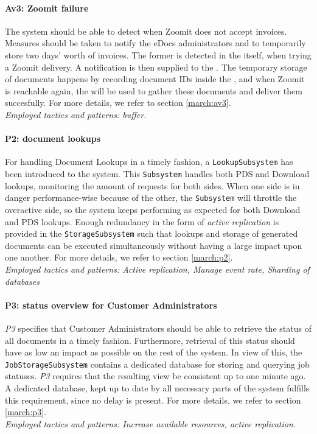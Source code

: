 \paragraph{Av3: Zoomit failure} The system should be able to detect when Zoomit does not accept invoices. Measures should be taken to notify the eDocs administrators and to temporarily store two days' worth of invoices. The former is detected in the  itself, when trying a Zoomit delivery. A notification is then supplied to the . The temporary storage of documents happens by recording document IDs inside the , and when Zoomit is reachable again, the  will be used to gather these documents and deliver them succesfully. For more details, we refer to section \ref{march:av3}.\\
\emph{Employed tactics and patterns: buffer.}
    
\paragraph{P2: document lookups}
For handling Document Lookups in a timely fashion, a \texttt{LookupSubsystem} has been introduced to the system. This \texttt{Subsystem} handles both PDS and Download lookups, monitoring the amount of requests for both sides. When one side is in danger performance-wise because of the other, the \texttt{Subsystem} will throttle the overactive side, so the system keeps performing as expected for both Download and PDS lookups. Enough redundancy in the form of \emph{active replication} is provided in the \texttt{StorageSubsystem} such that lookups and storage of generated documents can be executed simultaneously without having a large impact upon one another. For more details, we refer to section \ref{march:p2}.\\
\emph{Employed tactics and patterns: Active replication, Manage event rate, Sharding of databases}
    
\paragraph{P3: status overview for Customer Administrators} \emph{P3} specifies that Customer Administrators should be able to retrieve the status of all documents in a timely fashion. Furthermore, retrieval of this status should have as low an impact as possible on the rest of the system. In view of this, the \texttt{JobStorageSubsystem} contains a dedicated database for storing and querying job statuses. \emph{P3} requires that the resulting view be consistent up to one minute ago. A dedicated database, kept up to date by all necessary parts of the system fulfills this requirement, since no delay is present. For more details, we refer to section \ref{march:p3}.\\
\emph{Employed tactics and patterns: Increase available resources, active replication.}
    
